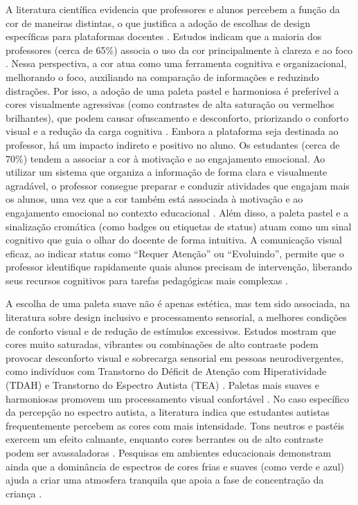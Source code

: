A literatura científica evidencia que professores e alunos percebem a função da cor de maneiras distintas, o que justifica a adoção de escolhas de design específicas para plataformas docentes \cite{imas2026role,tabora2026systematic}. Estudos indicam que a maioria dos professores (cerca de 65\%) associa o uso da cor principalmente à clareza e ao foco \cite{imas2026role}. Nessa perspectiva, a cor atua como uma ferramenta cognitiva e organizacional, melhorando o foco, auxiliando na comparação de informações e reduzindo distrações. Por isso, a adoção de uma paleta pastel e harmoniosa é preferível a cores visualmente agressivas (como contrastes de alta saturação ou vermelhos brilhantes), que podem causar ofuscamento e desconforto, priorizando o conforto visual e a redução da carga cognitiva \cite{bertoletti2026light}. Embora a plataforma seja destinada ao professor, há um impacto indireto e positivo no aluno. Os estudantes (cerca de 70\%) tendem a associar a cor à motivação e ao engajamento emocional. Ao utilizar um sistema que organiza a informação de forma clara e visualmente agradável, o professor consegue preparar e conduzir atividades que engajam mais os alunos, uma vez que a cor também está associada à motivação e ao engajamento emocional no contexto educacional \cite{imas2026role}. Além disso, a paleta pastel e a sinalização cromática (como badges ou etiquetas de status) atuam como um sinal cognitivo que guia o olhar do docente de forma intuitiva. A comunicação visual eficaz, ao indicar status como “Requer Atenção” ou “Evoluindo”, permite que o professor identifique rapidamente quais alunos precisam de intervenção, liberando seus recursos cognitivos para tarefas pedagógicas mais complexas \cite{tabora2026systematic}.

A escolha de uma paleta suave não é apenas estética, mas tem sido associada, na literatura sobre design inclusivo e processamento sensorial, a melhores condições de conforto visual e de redução de estímulos excessivos. Estudos mostram que cores muito saturadas, vibrantes ou combinações de alto contraste podem provocar desconforto visual e sobrecarga sensorial em pessoas neurodivergentes, como indivíduos com Transtorno do Déficit de Atenção com Hiperatividade (TDAH) e Transtorno do Espectro Autista (TEA) \cite{bertoletti2026light,wiley2025notice,morellato2025comunicacao}. Paletas mais suaves e harmoniosas promovem um processamento visual confortável \cite{bertoletti2026light}. No caso específico da percepção no espectro autista, a literatura indica que estudantes autistas frequentemente percebem as cores com mais intensidade. Tons neutros e pastéis exercem um efeito calmante, enquanto cores berrantes ou de alto contraste podem ser avassaladoras \cite{bertoletti2026light,wiley2025notice}. Pesquisas em ambientes educacionais demonstram ainda que a dominância de espectros de cores frias e suaves (como verde e azul) ajuda a criar uma atmosfera tranquila que apoia a fase de concentração da criança \cite{imas2026role,bertoletti2026light}.

